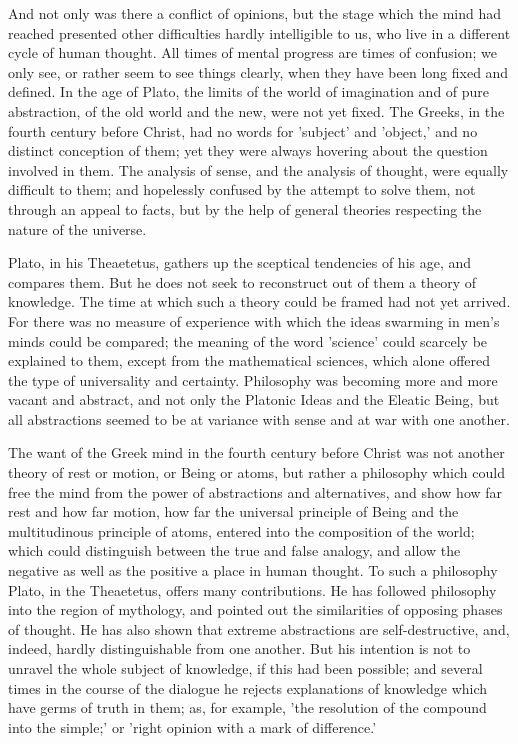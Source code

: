 \documentclass[11pt,letter]{article}
\begin{document}
\par  And not only was there a conflict of opinions, but the stage which the mind had reached presented other difficulties hardly intelligible to us, who live in a different cycle of human thought. All times of mental progress are times of confusion; we only see, or rather seem to see things clearly, when they have been long fixed and defined. In the age of Plato, the limits of the world of imagination and of pure abstraction, of the old world and the new, were not yet fixed. The Greeks, in the fourth century before Christ, had no words for 'subject' and 'object,' and no distinct conception of them; yet they were always hovering about the question involved in them. The analysis of sense, and the analysis of thought, were equally difficult to them; and hopelessly confused by the attempt to solve them, not through an appeal to facts, but by the help of general theories respecting the nature of the universe.

\par  Plato, in his Theaetetus, gathers up the sceptical tendencies of his age, and compares them. But he does not seek to reconstruct out of them a theory of knowledge. The time at which such a theory could be framed had not yet arrived. For there was no measure of experience with which the ideas swarming in men's minds could be compared; the meaning of the word 'science' could scarcely be explained to them, except from the mathematical sciences, which alone offered the type of universality and certainty. Philosophy was becoming more and more vacant and abstract, and not only the Platonic Ideas and the Eleatic Being, but all abstractions seemed to be at variance with sense and at war with one another.

\par  The want of the Greek mind in the fourth century before Christ was not another theory of rest or motion, or Being or atoms, but rather a philosophy which could free the mind from the power of abstractions and alternatives, and show how far rest and how far motion, how far the universal principle of Being and the multitudinous principle of atoms, entered into the composition of the world; which could distinguish between the true and false analogy, and allow the negative as well as the positive a place in human thought. To such a philosophy Plato, in the Theaetetus, offers many contributions. He has followed philosophy into the region of mythology, and pointed out the similarities of opposing phases of thought. He has also shown that extreme abstractions are self-destructive, and, indeed, hardly distinguishable from one another. But his intention is not to unravel the whole subject of knowledge, if this had been possible; and several times in the course of the dialogue he rejects explanations of knowledge which have germs of truth in them; as, for example, 'the resolution of the compound into the simple;' or 'right opinion with a mark of difference.'
\end{document}
